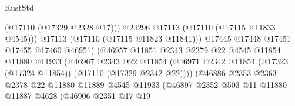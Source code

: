 \begin{lexlean}{RustStd}
\begin{coremodule}
                                                (@17110 (@17329 @2328 @17)))
                                              @24296
                                              @17113
                                              (@17110 (@17115 @11833 @4545)))
                                            @17113
                                            (@17110 (@17115 @11823 @11841)))
                                          @17445
                                          @17448
                                          @17451
                                          @17455
                                          @17460
                                          @46951)
                                        (@46957
                                          @11851
                                          @2343
                                          @2379
                                          @22
                                          @4545
                                          @11854
                                          @11880
                                          @11933
                                          (@46967
                                            @2343
                                            @22
                                            @11854
                                            (@46971
                                              @2342
                                              @11854
                                              (@17323 (@17324 @11854))
                                              (@17110 (@17329 @2342 @22))))
                                          (@46886
                                            @2353
                                            @2363
                                            @2378
                                            @22
                                            @11880
                                            @11889
                                            @4545
                                            @11933
                                            (@46897
                                              @2352
                                              @503
                                              @11
                                              @11880
                                              @11887
                                              @4628
                                              (@46906
                                                @2351
                                                @17
                                                @19

\end{coremodule}
\end{lexlean}
